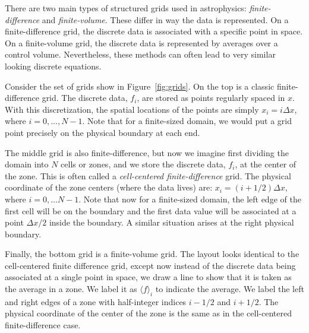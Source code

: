 There are two main types of structured grids used in astrophysics:
{\em finite-difference} and {\em finite-volume}.  These differ in way
the data is represented.  On a finite-difference grid, the discrete
data is associated with a specific point in space.  On a
finite-volume grid, the discrete data is represented by averages over
a control volume.  Nevertheless, these methods can often lead to very
similar looking discrete equations.

Consider the set of grids show in Figure~\ref{fig:grids}.  On the top
is a classic finite-difference grid.  The discrete data, $f_i$, are
stored as points regularly spaced in $x$.  With this discretization,
the spatial locations of the points are simply $x_i = i \Delta x$,
where $i = 0, \ldots, N-1$.  Note that for a finite-sized domain, we
would put a grid point precisely on the physical boundary at each end.

The middle grid is also finite-difference, but now we imagine first
dividing the domain into $N$ cells or zones, and we store the discrete
data, $f_i$, at the center of the zone.  This is often called a {\em
  cell-centered finite-difference} grid.  The physical coordinate of
the zone centers (where the data lives) are: $x_i = (i + 1/2)\Delta
x$, where $i = 0, \ldots N-1$.  Note that now for a finite-sized
domain, the left edge of the first cell will be on the boundary and
the first data value will be associated at a point $\Delta x/2$ inside
the boundary.  A similar situation arises at the right physical
boundary.

Finally, the bottom grid is a finite-volume grid.  The layout looks
identical to the cell-centered finite difference grid, except now
instead of the discrete data being associated at a single point in
space, we draw a line to show that it is taken as the average in a
zone.  We label it as $\langle f\rangle_i$ to indicate the average.
We label the left and right edges of a zone with half-integer indices
$i-1/2$ and $i+1/2$.  The physical coordinate of the center of the zone
is the same as in the cell-centered finite-difference case.


